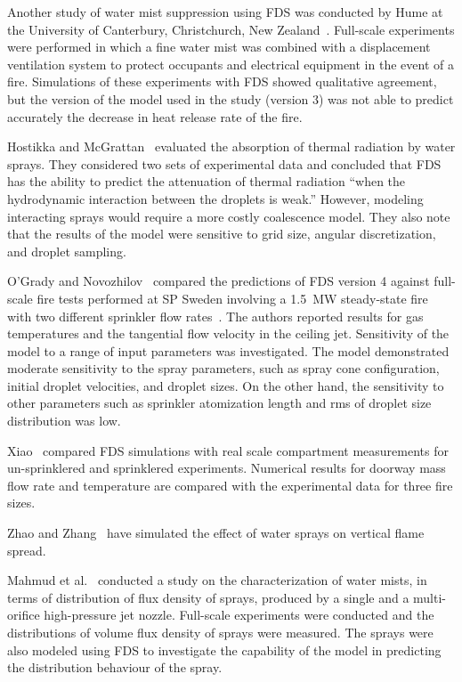 Another study of water mist suppression using FDS was conducted by Hume  at  the  University  of  Canterbury,  Christchurch,  New Zealand~\cite{Hume:Masters}. Full-scale experiments were performed in which a fine water mist was combined with a displacement ventilation system to protect occupants and electrical equipment in the event of a fire. Simulations of these experiments with FDS showed qualitative agreement, but the version of the model used in the study (version 3) was not able to predict accurately the decrease in heat release rate of the fire.

Hostikka  and  McGrattan~\cite{Hostikka:FSJ2006}  evaluated  the absorption of thermal radiation by water sprays. They considered two sets of experimental data and concluded that FDS has the ability to predict the attenuation of thermal radiation ``when the hydrodynamic interaction between  the droplets is  weak.'' However, modeling interacting sprays would require a more costly coalescence model. They also note that the results of the model were sensitive to grid size, angular discretization, and droplet sampling.

O'Grady and Novozhilov~\cite{OGrady:CST} compared the predictions of FDS version 4 against full-scale fire tests performed at SP Sweden involving a 1.5~MW steady-state fire with two different sprinkler flow rates~\cite{Ingason:1}. The authors reported results for gas temperatures and the tangential flow velocity in the ceiling jet. Sensitivity of the model to a range of input parameters was investigated. The model demonstrated moderate sensitivity to the spray parameters, such as spray cone configuration, initial droplet velocities, and droplet sizes. On the other hand, the sensitivity to other parameters such as sprinkler atomization length and rms of droplet size distribution was low.

Xiao~\cite{Xiao:FT2012} compared FDS simulations with real scale compartment measurements for un-sprinklered and sprinklered experiments. Numerical results for doorway mass flow rate and temperature are compared with the experimental data for three fire sizes.

Zhao and Zhang~\cite{Zhao:2014,Zhao:2023} have simulated the effect of water sprays on vertical flame spread.

Mahmud et al.~\cite{Mahmud:FSJ2016} conducted a study on the characterization of water mists, in terms of distribution of flux density of sprays, produced by a single and a multi-orifice high-pressure jet nozzle. Full-scale experiments were conducted and the distributions of volume flux density of sprays were measured. The sprays were also modeled using FDS to investigate the capability of the model in predicting the distribution behaviour of the spray. 

